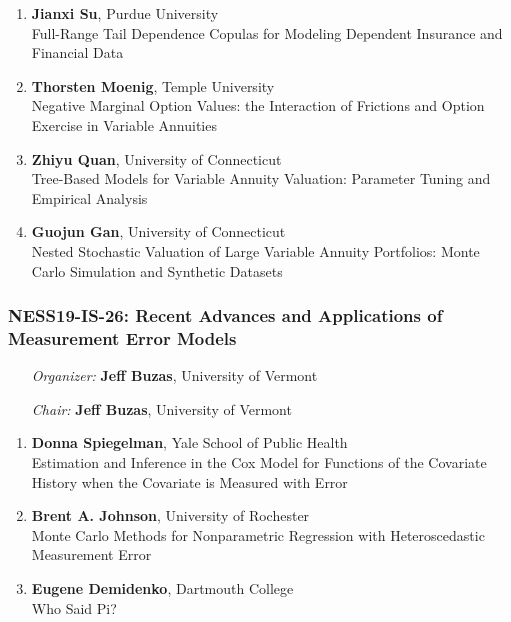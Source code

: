 \begin{enumerate}
\item \textbf{Jianxi Su}, Purdue University \\
Full-Range Tail Dependence Copulas for Modeling Dependent Insurance and Financial Data
\item \textbf{Thorsten Moenig}, Temple University \\
Negative Marginal Option Values:  the Interaction of Frictions and Option Exercise in Variable Annuities
\item \textbf{Zhiyu Quan}, University of Connecticut \\
Tree-Based Models for Variable Annuity Valuation: Parameter Tuning and Empirical Analysis
\item \textbf{Guojun Gan}, University of Connecticut \\
Nested Stochastic Valuation of Large Variable Annuity Portfolios: Monte Carlo Simulation and Synthetic Datasets
\end{enumerate}

\subsubsection*{NESS19-IS-26: Recent Advances and Applications of Measurement Error Models}

\begin{enumerate}[align=left]
\item [\emph{Organizer:}] \textbf{Jeff Buzas}, University of Vermont
\item [\emph{Chair:}] \textbf{Jeff Buzas}, University of Vermont
\end{enumerate}

\begin{enumerate}
\item \textbf{Donna Spiegelman}, Yale School of Public Health \\
Estimation and Inference in the Cox Model for Functions of the Covariate History when the Covariate is Measured with Error
\item \textbf{Brent A. Johnson}, University of Rochester \\
Monte Carlo Methods for Nonparametric Regression with Heteroscedastic Measurement Error
\item \textbf{Eugene Demidenko}, Dartmouth College \\
Who Said Pi?
\end{enumerate}

